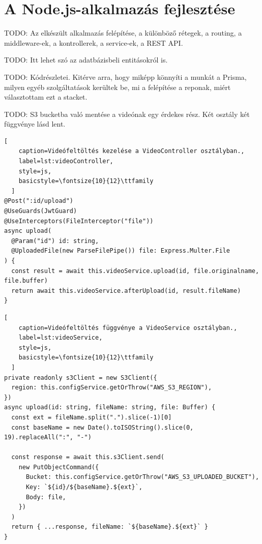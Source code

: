 \section{A Node.js-alkalmazás fejlesztése}

TODO: Az elkészült alkalmazás felépítése, a különböző rétegek, a routing, a middleware-ek, a kontrollerek, a service-ek, a REST API.

TODO: Itt lehet szó az adatbázisbeli entitásokról is.

TODO: Kódrészletei. Kitérve arra, hogy miképp könnyíti a munkát a Prisma, milyen egyéb szolgáltatások kerültek be, mi a felépítése a reponak, miért választottam ezt a stacket.

TODO: S3 bucketba való mentése a videónak egy érdekes rész. Két osztály két függvénye lásd lent.

\begin{minipage}{0.92\textwidth}
  \begin{lstlisting}[
    caption=Videófeltöltés kezelése a VideoController osztályban.,
    label=lst:videoController,
    style=js,
    basicstyle=\fontsize{10}{12}\ttfamily
  ]
@Post(":id/upload")
@UseGuards(JwtGuard)
@UseInterceptors(FileInterceptor("file"))
async upload(
  @Param("id") id: string,
  @UploadedFile(new ParseFilePipe()) file: Express.Multer.File
) {
  const result = await this.videoService.upload(id, file.originalname, file.buffer)
  return await this.videoService.afterUpload(id, result.fileName)
}
\end{lstlisting}
\end{minipage}

\begin{minipage}{0.92\textwidth}
  \begin{lstlisting}[
    caption=Videófeltöltés függvénye a VideoService osztályban.,
    label=lst:videoService,
    style=js,
    basicstyle=\fontsize{10}{12}\ttfamily
  ]
private readonly s3Client = new S3Client({
  region: this.configService.getOrThrow("AWS_S3_REGION"),
})
async upload(id: string, fileName: string, file: Buffer) {
  const ext = fileName.split(".").slice(-1)[0]
  const baseName = new Date().toISOString().slice(0, 19).replaceAll(":", "-")

  const response = await this.s3Client.send(
    new PutObjectCommand({
      Bucket: this.configService.getOrThrow("AWS_S3_UPLOADED_BUCKET"),
      Key: `${id}/${baseName}.${ext}`,
      Body: file,
    })
  )
  return { ...response, fileName: `${baseName}.${ext}` }
}
\end{lstlisting}
\end{minipage}

